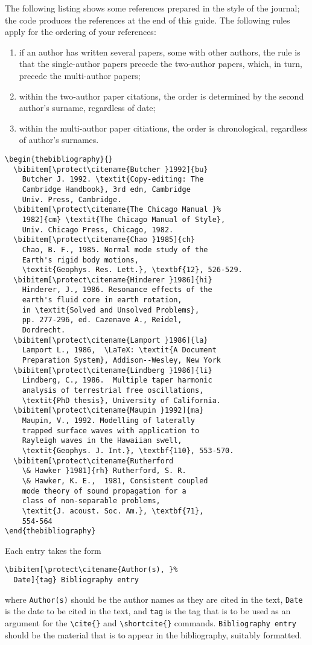 \documentclass{gji}
\begin{document}
The following listing shows some references prepared in the style of
the journal; the code produces the references at the end of this guide.
The following rules apply for the ordering of your references:
\begin{enumerate}
  \item if an author has written several papers, some with other authors,
        the rule is that the single-author papers precede the two-author
        papers, which, in turn, precede the multi-author papers;
  \item within the two-author paper citations, the order is determined
        by the second author's surname, regardless of date;
  \item within the multi-author paper citiations, the order is
        chronological, regardless of author's surnames.
\end{enumerate}
%
\begin{verbatim}
\begin{thebibliography}{}
  \bibitem[\protect\citename{Butcher }1992]{bu}
    Butcher J. 1992. \textit{Copy-editing: The
    Cambridge Handbook}, 3rd edn, Cambridge
    Univ. Press, Cambridge.
  \bibitem[\protect\citename{The Chicago Manual }%
    1982]{cm} \textit{The Chicago Manual of Style},
    Univ. Chicago Press, Chicago, 1982.
  \bibitem[\protect\citename{Chao }1985]{ch}
    Chao, B. F., 1985. Normal mode study of the
    Earth's rigid body motions,
    \textit{Geophys. Res. Lett.}, \textbf{12}, 526-529.
  \bibitem[\protect\citename{Hinderer }1986]{hi}
    Hinderer, J., 1986. Resonance effects of the
    earth's fluid core in earth rotation,
    in \textit{Solved and Unsolved Problems},
    pp. 277-296, ed. Cazenave A., Reidel,
    Dordrecht.
  \bibitem[\protect\citename{Lamport }1986]{la}
    Lamport L., 1986,  \LaTeX: \textit{A Document
    Preparation System}, Addison--Wesley, New York
  \bibitem[\protect\citename{Lindberg }1986]{li}
    Lindberg, C., 1986.  Multiple taper harmonic
    analysis of terrestrial free oscillations,
    \textit{PhD thesis}, University of California.
  \bibitem[\protect\citename{Maupin }1992]{ma}
    Maupin, V., 1992. Modelling of laterally
    trapped surface waves with application to
    Rayleigh waves in the Hawaiian swell,
    \textit{Geophys. J. Int.}, \textbf{110}, 553-570.
  \bibitem[\protect\citename{Rutherford
    \& Hawker }1981]{rh} Rutherford, S. R.
    \& Hawker, K. E.,  1981, Consistent coupled
    mode theory of sound propagation for a
    class of non-separable problems,
    \textit{J. acoust. Soc. Am.}, \textbf{71},
    554-564
\end{thebibliography}
\end{verbatim}
Each entry takes the form
\begin{verbatim}
\bibitem[\protect\citename{Author(s), }%
  Date]{tag} Bibliography entry
\end{verbatim}
where \verb"Author(s)" should be the author names as they are cited in
the text, \verb"Date" is the date to be cited in the text, and
\verb"tag" is the tag that is to be used as an argument for the
\verb"\cite{}" and \verb"\shortcite{}" commands. \verb"Bibliography entry"
should be the material that is to appear in the bibliography,
suitably formatted.
\end{document}
